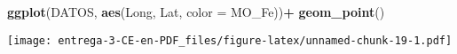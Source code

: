 \documentclass[
]{article}
\newenvironment{Shaded}{\begin{snugshade}}{\end{snugshade}}
\newcommand{\DataTypeTok}[1]{\textcolor[rgb]{0.13,0.29,0.53}{#1}}
\newcommand{\DecValTok}[1]{\textcolor[rgb]{0.00,0.00,0.81}{#1}}
\newcommand{\KeywordTok}[1]{\textcolor[rgb]{0.13,0.29,0.53}{\textbf{#1}}}
\newcommand{\NormalTok}[1]{#1}
\newcommand{\OperatorTok}[1]{\textcolor[rgb]{0.81,0.36,0.00}{\textbf{#1}}}
\newcommand{\StringTok}[1]{\textcolor[rgb]{0.31,0.60,0.02}{#1}}
\begin{document}
\begin{Shaded}
\begin{Highlighting}[]
\KeywordTok{ggplot}\NormalTok{(DATOS, }\KeywordTok{aes}\NormalTok{(Long, Lat, }\DataTypeTok{color =}\NormalTok{ MO_Fe))}\OperatorTok{+}
\StringTok{  }\KeywordTok{geom_point}\NormalTok{()}
\end{Highlighting}
\end{Shaded}

\texttt{[image: entrega-3-CE-en-PDF\_files/figure-latex/unnamed-chunk-19-1.pdf]}

\begin{Shaded}
\end{Shaded}
\end{document}

